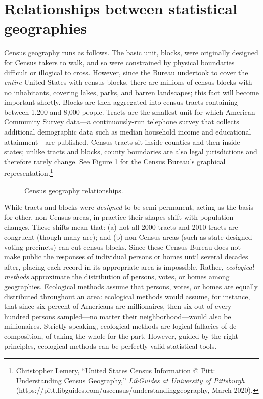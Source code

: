 \documentclass[12pt,oneside]{psthesis}
\begin{document}
\hypertarget{census-geography}{%
\section{Relationships between statistical geographies}\label{census-geography}}

Census geography runs as follows.
The basic unit, blocks, were originally designed for Census takers to walk, and so were constrained by physical boundaries difficult or illogical to cross.
However, since the Bureau undertook to cover the \emph{entire} United States with census blocks, there are millions of census blocks with no inhabitants, covering lakes, parks, and barren landscapes; this fact will become important shortly.
Blocks are then aggregated into census tracts containing between 1,200 and 8,000 people.
Tracts are the smallest unit for which American Community Survey data---a continuously-run telephone survey that collects additional demographic data such as median household income and educational attainment---are published.
Census tracts sit inside counties and then inside states; unlike tracts and blocks, county boundaries are also legal jurisdictions and therefore rarely change.
See Figure \ref{fig:geography} for the Census Bureau's graphical representation.\footnote{Christopher Lemery, ``United States Census Information @ Pitt: Understanding Census Geography,'' \emph{LibGuides at University of Pittsburgh} (https://pitt.libguides.com/uscensus/understandinggeography, March 2020).}
\begin{figure}

{\centering {}

}

\caption{Census geography relationships.}\label{fig:geography}
\end{figure}
While tracts and blocks were \emph{designed} to be semi-permanent, acting as the basis for other, non-Census areas, in practice their shapes shift with population changes.
These shifts mean that: (a) not all 2000 tracts and 2010 tracts are congruent (though many are); and (b) non-Census areas (such as state-designed voting precincts) can cut census blocks.
Since these Census Bureau does not make public the responses of individual persons or homes until several decades after, placing each record in its appropriate area is impossible.
Rather, \emph{ecological methods} approximate the distribution of persons, votes, or homes among geographies.
Ecological methods assume that persons, votes, or homes are equally distributed throughout an area: ecological methods would assume, for instance, that since six percent of Americans are millionaires, then six out of every hundred persons sampled---no matter their neighborhood---would also be millionaires.
Strictly speaking, ecological methods are logical fallacies of de-composition, of taking the whole for the part.
However, guided by the right principles, ecological methods can be perfectly valid statistical tools.
\end{document}
